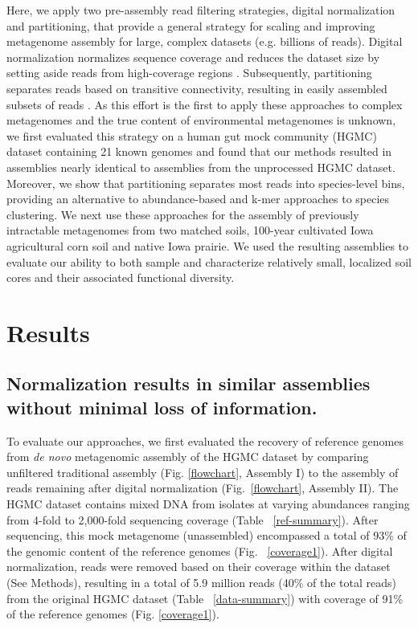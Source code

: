 \documentclass{pnastwo}
\begin{document}
\begin{article}
Here, we apply two pre-assembly read filtering strategies, digital
normalization and partitioning, that provide a general strategy for scaling and
improving metagenome assembly for large, complex datasets (e.g. billions of reads). 
Digital normalization normalizes sequence 
coverage and reduces the dataset size by setting aside reads from high-coverage
regions \cite{browndiginorm}. Subsequently, partitioning separates reads based
on transitive connectivity, resulting in easily assembled subsets of reads \cite{Pell:2012cq}. 
As this effort is the first to apply these approaches to complex metagenomes and the true content of environmental metagenomes is unknown, 
we first evaluated this strategy on a human gut mock community (HGMC) dataset containing 21 known genomes and found that our 
methods resulted in assemblies nearly identical to assemblies from the unprocessed HGMC
dataset.  Moreover, we show that partitioning separates most reads into
species-level bins, providing an alternative to abundance-based and k-mer
approaches to species clustering.  We next use these approaches for the assembly of previously intractable
metagenomes from two matched soils, 100-year cultivated Iowa agricultural corn soil
and native Iowa prairie.  We used the resulting assemblies to evaluate our ability to both sample and characterize relatively small, localized soil cores and their associated functional diversity.

\section*{Results} \subsection*{Normalization results in similar assemblies without minimal loss of information.} To evaluate our approaches, we first evaluated the recovery of reference genomes from {\em de novo} metagenomic
assembly of the HGMC dataset by comparing unfiltered traditional assembly (Fig.
\ref{flowchart}, Assembly I) to the assembly of reads remaining after digital
normalization (Fig.~\ref{flowchart}, Assembly II). The HGMC dataset contains mixed DNA from isolates at varying abundances ranging from 4-fold to
2,000-fold sequencing coverage (Table ~\ref{ref-summary}).  After sequencing, this mock metagenome (unassembled) encompassed a total of 93\% of the genomic content of the reference genomes (Fig. ~\ref{coverage1}).
After digital normalization, reads were removed based on their coverage within
the dataset (See Methods), resulting in a total of 5.9 million reads (40\% of
the total reads) from the original HGMC dataset (Table ~\ref{data-summary}) with coverage of 91\% of the reference
genomes (Fig. \ref{coverage1}).


\end{article}
\end{document}
